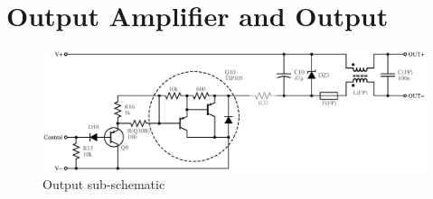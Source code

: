 \section{Output Amplifier and Output}

\begin{figure}[H]
\centering
\includegraphics[width=5in]{sch/output}
\caption{Output sub-schematic}
\label{fig:output}
\end{figure}

